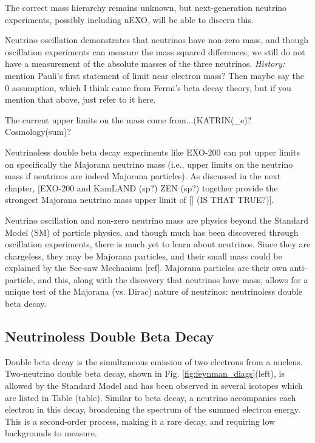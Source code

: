 \noindent
The correct mass hierarchy remains unknown, but next-generation neutrino experiments, possibly including nEXO, will be able to discern this.

Neutrino oscillation demonstrates that neutrinos have non-zero mass, and though oscillation experiments can measure the mass squared differences, we still do not have a measurement of the absolute masses of the three neutrinos.  {\color{gray}\emph{History:  }mention Pauli's first statement of limit near electron mass?  Then maybe say the 0 assumption, which I think came from Fermi's beta decay theory, but if you mention that above, just refer to it here.}

The current upper limits on the mass come from...(KATRIN(\rightarrow\nu_{e})?  Cosmology(\rightarrow sum)?

Neutrinoless double beta decay experiments like EXO-200 can put upper limits on specifically the Majorana neutrino mass (i.e., upper limits on the neutrino mass if neutrinos are indeed Majorana particles).  As discussed in the next chapter, [EXO-200 and KamLAND (sp?) ZEN (sp?) together provide the strongest Majorana neutrino mass upper limit of [] (IS THAT TRUE?)].

Neutrino oscillation and non-zero neutrino mass are physics beyond the Standard Model (SM) of particle physics, and though much has been discovered through oscillation experiments, there is much yet to learn about neutrinos. Since they are chargeless, they may be Majorana particles, and their small mass could be explained by the See-saw Mechanism [ref]. Majorana particles are their own anti-particle, and this, along with the discovery that neutrinos have mass, allows for a unique test of the Majorana (vs. Dirac) nature of neutrinos: neutrinoless double beta decay.

\subsection{Neutrinoless Double Beta Decay}

Double beta decay is the simultaneous emission of two electrons from a nucleus.  Two-neutrino double beta decay, shown in Fig. \ref{fig:feynman_diags}(left), is allowed by the Standard Model and has been observed in several isotopes which are listed in Table (table).  Similar to beta decay, a neutrino accompanies each electron in this decay, broadening the spectrum of the summed electron energy. This is a second-order process, making it a rare decay, and requiring low backgrounds to measure.

